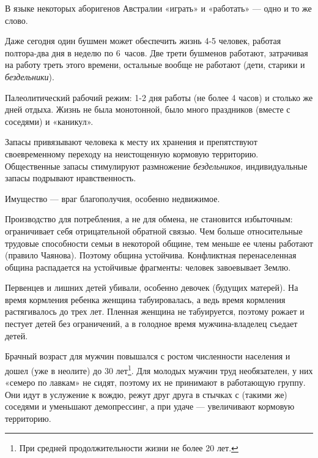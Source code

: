 В языке некоторых аборигенов Австралии «играть» и «работать» — одно и то же слово.

Даже сегодня один бушмен может обеспечить жизнь 4-5 человек, работая полтора-два дня в неделю по 6~часов. Две трети
бушменов работают, затрачивая на работу треть этого времени, остальные вообще не работают (дети, старики и
\textit{бездельники}).

Палеолитический рабочий режим: 1-2 дня работы (не более 4 часов) и столько же дней отдыха. Жизнь не была монотонной,
было много праздников (вместе с соседями) и «каникул».

Запасы привязывают человека к месту их хранения и препятствуют своевременному переходу на неистощенную кормовую
территорию. Общественные запасы стимулируют размножение \textit{бездельников,} индивидуальные запасы подрывают
нравственность.

Имущество — враг благополучия, особенно недвижимое.

Производство для потребления, а не для обмена, не становится избыточным: ограничивает себя отрицательной обратной
связью. Чем больше относительные трудовые способности семьи в некоторой общине, тем меньше ее члены работают (правило
Чаянова). Поэтому община устойчива. Конфликтная перенаселенная община распадается на устойчивые фрагменты: человек
завоевывает Землю.

Первенцев и лишних детей убивали, особенно девочек (будущих матерей). На время кормления ребенка женщина табуировалась,
а ведь время кормления растягивалось до трех лет. Пленная женщина не табуируется, поэтому рожает и пестует детей без
ограничений, а в голодное время мужчина-владелец съедает детей.

Брачный возраст для мужчин повышался с ростом численности населения и дошел (уже в неолите) до 30
лет\footnote{При средней продолжительности жизни не более 20 лет.}. Для молодых мужчин труд
необязателен, у них «семеро по лавкам» не сидят, поэтому их не принимают в работающую группу. Они идут в услужение к
вождю, режут друг друга в стычках с (такими же) соседями и уменьшают демопрессинг, а при удаче — увеличивают кормовую
территорию.

